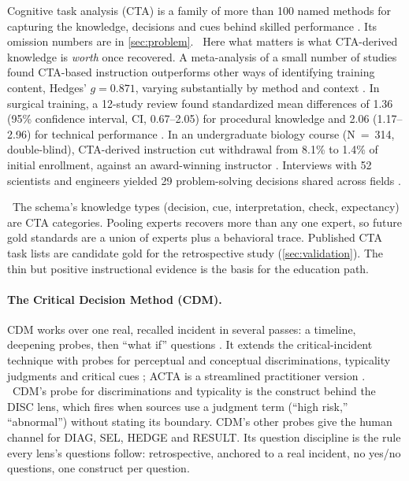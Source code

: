 Cognitive task analysis (CTA) is a family of more than 100 named methods
\parencite{yates2011advancing} for capturing the knowledge, decisions and
cues behind skilled performance
\parencite{schraagen2000cognitive,crandall2006working,clark2008cognitive}.
Its omission numbers are in \cref{sec:problem}. \evlit\ Here what matters is
what CTA-derived knowledge is \emph{worth} once recovered. A
meta-analysis of a small number of studies found CTA-based instruction
outperforms other ways of identifying training content, Hedges'
$g = 0.871$, varying substantially by method and context
\parencite{tofelgrehl2013cognitive}. In surgical training, a 12-study review
found standardized mean differences of 1.36 (95\% confidence interval, CI, 0.67--2.05) for
procedural knowledge and 2.06 (1.17--2.96) for technical performance
\parencite{edwards2021cognitive}. In an undergraduate biology course
(N~=~314, double-blind), CTA-derived instruction cut withdrawal from 8.1\% to
1.4\% of initial enrollment, against an award-winning instructor
\parencite{feldon2010translating}. Interviews with 52 scientists and
engineers yielded 29 problem-solving decisions shared across fields
\parencite{price2021detailed}.

\evint\ The schema's knowledge types (decision, cue, interpretation, check,
expectancy) are CTA categories. Pooling experts recovers more than any one
expert, so future gold standards are a union of experts plus a behavioral
trace. Published CTA task lists are candidate gold for the retrospective
study (\cref{sec:validation}). The thin but positive instructional evidence
is the basis for the education path.

\paragraph{The Critical Decision Method (CDM).} CDM works over one real,
recalled incident in several passes: a timeline, deepening probes, then
``what if'' questions \parencite{hoffman1998use}. It extends the
critical-incident technique with probes for perceptual and conceptual
discriminations, typicality judgments and critical cues
\parencite{klein1989critical}; ACTA is a streamlined practitioner version
\parencite{militello1998applied}. \evint\ CDM's probe for discriminations and typicality is the construct
behind the DISC lens, which fires when sources use a judgment term (``high
risk,'' ``abnormal'') without stating its boundary. CDM's other probes give
the human channel for DIAG, SEL, HEDGE and RESULT. Its question discipline is
the rule every lens's questions follow: retrospective, anchored to a real
incident, no yes/no questions, one construct per question.

